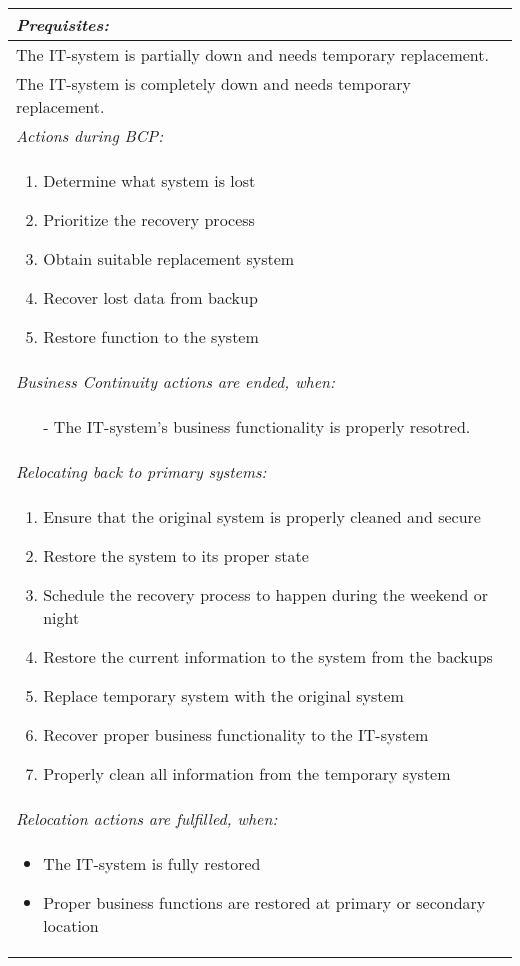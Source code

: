 \begin{longtable}{| p{13cm} |}
	\emph{Prequisites:}\\\hline
	The IT-system is partially down and needs temporary replacement.\\The IT-system is completely down and needs temporary replacement.\\\hline
	\emph{Actions during BCP:}\\\hline
	\begin{enumerate}
		\item Determine what system is lost
		\item Prioritize the recovery process
		\item Obtain suitable replacement system
		\item Recover lost data from backup
		\item Restore function to the system
	\end{enumerate}\\\hline
	\emph{Business Continuity actions are ended, when:}\\\hline
	\begin{itemize}
		\item[-] The IT-system's business functionality is properly resotred.
	\end{itemize}\\\hline
	\emph{Relocating back to primary systems:}\\\hline
	\begin{enumerate}
		\item Ensure that the original system is properly cleaned and secure
		\item Restore the system to its proper state
		\item Schedule the recovery process to happen during the weekend or night
		\item Restore the current information to the system	from the backups
		\item Replace temporary system with the original system
		\item Recover proper business functionality to the IT-system
		\item Properly clean all information from the temporary system
	\end{enumerate}\\\hline
	\emph{Relocation actions are fulfilled, when:}\\\hline
	\begin{itemize}
		\item The IT-system is fully restored
		\item Proper business functions are restored at primary or secondary location
	\end{itemize}\\\hline
\end{longtable}
